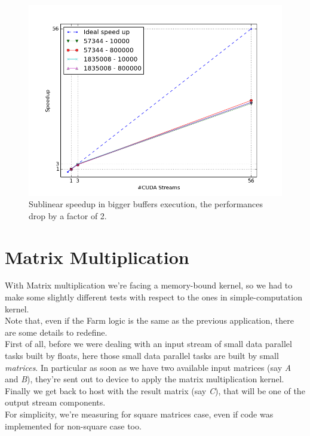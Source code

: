 	\begin{figure}
		\vspace{-2cm}
		\centering
		\includegraphics[scale=0.52]{plots/cos_speedup_biggerbuffer.png}
		\caption{Sublinear speedup in bigger buffers execution, the performances drop by a factor of 2.}
		\label{fig:biggerbufferspeedup}
		
	\end{figure}








\section{Matrix Multiplication}
With Matrix multiplication we're facing a memory-bound kernel, so we had to make some slightly different tests with respect to the ones in simple-computation kernel.\\
Note that, even if the Farm logic is the same as the previous application, there are some details to redefine.\\
First of all, before we were dealing with an input stream of small data parallel tasks built by floats, here those small data parallel tasks are built by small \textit{matrices}. In particular as soon as we have two available input matrices (say \textit{A} and \textit{B}), they're sent out to device to apply the matrix multiplication kernel.\\
Finally we get back to host with the result matrix (say \textit{C}), that will be one of the output stream components.\\
For simplicity, we're measuring for square matrices case, even if code was implemented for non-square case too. 

